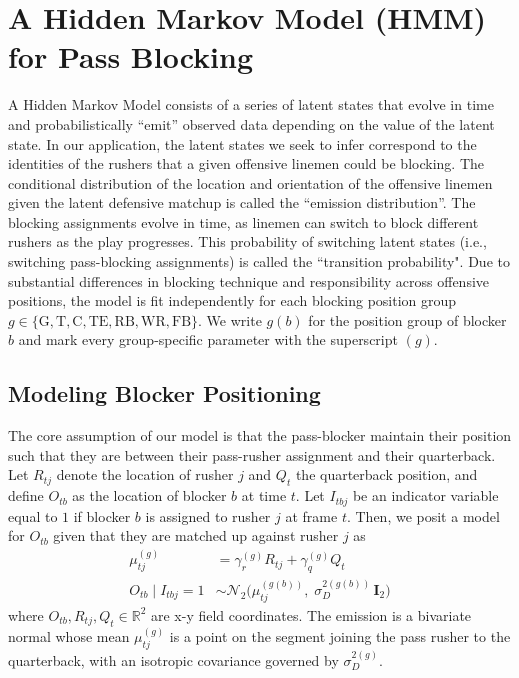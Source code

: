 \documentclass[USenglish]{article}
\let\OldSubsection\subsection
\renewcommand{\subsection}{\FloatBarrier\OldSubsection}
\theoremstyle{dgthm}
\theoremstyle{dgdef}
\begin{document}
\section{A Hidden Markov Model (HMM) for Pass Blocking} \label{methods}
\label{sec:methods}



A Hidden Markov Model consists of a series of latent states that evolve in time and probabilistically ``emit'' observed data depending on the value of the latent state.  In our application, the latent states we seek to infer correspond to the identities of the rushers that a given offensive linemen could be blocking.  The conditional distribution of the location and orientation of the offensive linemen given the latent defensive matchup is called the ``emission distribution''. The blocking assignments evolve in time, as linemen can switch to block different rushers as the play progresses.  This probability of switching latent states (i.e., switching pass-blocking assignments) is called the ``transition probability".  Due to substantial differences in blocking technique and responsibility across offensive positions, the model is fit independently for each blocking position group $g \in \{\text{G},\text{T},\text{C},\text{TE},\text{RB},\text{WR},\text{FB}\}$. We write $g(b)$ for the position group of blocker $b$ and mark every group-specific parameter with the superscript $(g)$. 

\subsection{Modeling Blocker Positioning}


The core assumption of our model is that the pass-blocker maintain their position such that they are between their pass-rusher assignment and their quarterback. Let $R_{tj}$ denote the location of rusher $j$ and $Q_t$ the quarterback position, and define $O_{tb}$ as the location of blocker $b$ at time $t$. Let $I_{tbj}$ be an indicator variable equal to $1$ if blocker $b$ is assigned to rusher $j$ at frame $t$. Then, we posit a model for $O_{tb}$ given that they are matched up against rusher $j$ as
\begin{align}
\mu^{(g)}_{tj} &= \gamma^{(g)}_r R_{tj} + \gamma^{(g)}_q Q_t\\
O_{tb} \mid I_{tbj} = 1 &\sim \mathcal{N}_2\big(\mu^{(g(b))}_{tj},\; \sigma^{2(g(b))}_D\, \mathbf{I}_2\big)
\end{align}
where $O_{tb}, R_{tj}, Q_t \in \mathbb{R}^2$ are x-y field coordinates. The emission is a bivariate normal whose mean $\mu^{(g)}_{tj}$ is a point on the segment joining the pass rusher to the quarterback, with an isotropic covariance governed by  $\sigma^{2(g)}_D$. 
\end{document}
